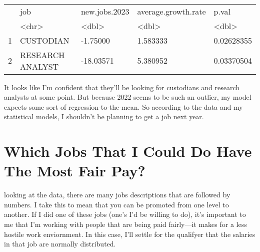 \documentclass[letterpaper]{article}
\theoremstyle{definition}
\begin{document}
    \begin{center}
    \end{center}
    { \hspace*{\fill} \\}
    
    

\begin{tabular}{r|llll}
  & job & new.jobs.2023 & average.growth.rate & p.val\\
  & <chr> & <dbl> & <dbl> & <dbl>\\
\hline
	1 & CUSTODIAN        &  -1.75000 & 1.583333 & 0.02628355\\
	2 & RESEARCH ANALYST & -18.03571 & 5.380952 & 0.03370504\\
\end{tabular}


    
    It looks like I'm confident that they'll be looking for custodians and
research analysts at some point. But because 2022 seems to be such an
outlier, my model expects some sort of regression-to-the-mean. So
according to the data and my statistical models, I shouldn't be planning
to get a job next year.

\hypertarget{which-jobs-that-i-could-do-have-the-most-fair-pay}{%
\section{Which Jobs That I Could Do Have The Most Fair
Pay?}\label{which-jobs-that-i-could-do-have-the-most-fair-pay}}

looking at the data, there are many jobs descriptions that are followed
by numbers. I take this to mean that you can be promoted from one level
to another. If I did one of these jobs (one's I'd be willing to do),
it's important to me that I'm working with people that are being paid
fairly---it makes for a less hostile work enviornment. In this case,
I'll settle for the qualifyer that the salaries in that job are normally
distributed.

    

    \begin{center}
    \end{center}
    { \hspace*{\fill} \\}
    
\end{document}
